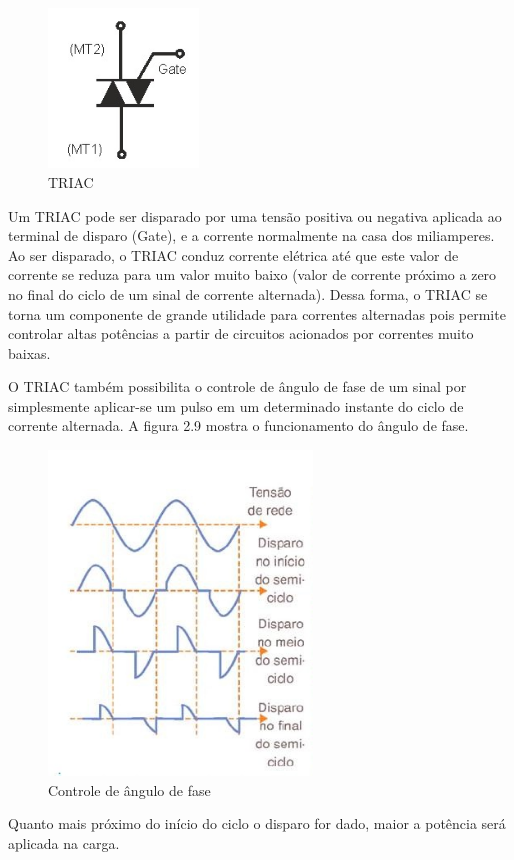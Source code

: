 \begin{figure}[h]

\center

\includegraphics[width=4cm]{imagens/imagem_triac.jpg}

\label{TRIAC}

\caption{TRIAC}

\end{figure}

Um TRIAC pode ser disparado por uma tensão positiva ou negativa aplicada ao terminal de disparo (Gate), e a corrente normalmente na casa dos miliamperes. Ao ser disparado, o TRIAC conduz corrente elétrica até que este valor de corrente se reduza para um valor muito baixo (valor de corrente próximo a zero no final do ciclo de um sinal de corrente alternada). Dessa forma, o TRIAC se torna um componente de grande utilidade para correntes alternadas pois permite controlar altas potências a partir de circuitos acionados por correntes muito baixas.

O TRIAC também possibilita o controle de ângulo de fase de um sinal por simplesmente aplicar-se um pulso em um determinado instante do ciclo de corrente alternada. A figura 2.9 mostra o funcionamento do ângulo de fase.

\begin{figure}[h]

\center

\includegraphics[width=7cm]{imagens/angulo_triac.jpg}

\label{Controle de ângulo de fase}

\caption{Controle de ângulo de fase}

\end{figure}
\noindent Quanto mais próximo do início do ciclo o disparo for dado, maior a potência será aplicada na carga.

